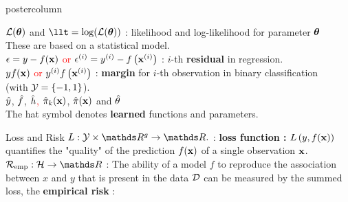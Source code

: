 \documentclass{beamer}
\begin{document}
\begin{frame}[fragile]{}
\begin{columns}
\begin{column}{.31\textwidth}
\begin{beamercolorbox}[center]{postercolumn}
\begin{minipage}{.98\textwidth}
{\begin{myblock}{}
              $\mathcal{L}(\bm{\theta})$ and $\llt = \log(\LLt)$ : likelihood and log-likelihood for parameter $\bm{\theta}$ \\
                \hspace*{1ex}These are based on a statistical model.\\
               
              \textcolor{red}{$\epsilon = y - f(\mathbf{x})$ or} $\epsilon^{(i)} = y^{(i)} - f\left(\mathbf{x}^{(i)}\right)$ : $i$-th \textbf{residual} in regression.\\

              \textcolor{red}{$y f(\mathbf{x})$ or} $y^{(i)} f\left(\mathbf{x}^{(i)}\right)$ : \textbf{margin} for $i$-th observation in binary classification \\
                \hspace*{1ex} (with $\mathcal{Y} = \{-1, 1\}$). \\
              
              $\hat{y}$, $\hat{f}$, \textcolor{red}{$\hat{h}$,} $\hat \pi_{k}(\mathbf{x})$, $\hat \pi(\mathbf{x})$ and $\hat{\theta}$ \\
                \hspace*{1ex}The hat symbol denotes \textbf{learned} functions and parameters.
					\end{myblock}
          \begin{myblock}{Loss and Risk}
				    $L: \Yspace \times \R^g \to \R.$ : \textbf{loss function : } $L\left(y, f(\mathbf{x})\right)$ quantifies the "quality" of the prediction $f(\mathbf{x})$ of a single observation $\mathbf{x}$.  \\
            
            $\riske:  \Hspace \to \R $ :  The ability of a model $f$ to reproduce the association between $x$ and $y$ that is present in the data $\mathcal{D}$ can be measured by the summed loss, the \textbf{empirical risk }:
            

\end{myblock}}
\end{minipage}
\end{beamercolorbox}
\end{column}
\end{columns}
\end{frame}
\end{document}
